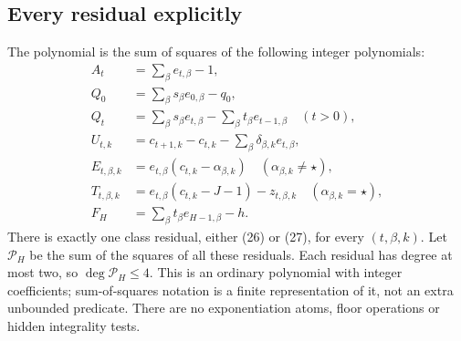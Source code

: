 \documentclass[11pt,a4paper]{article}
\numberwithin{equation}{section}
\begin{document}
\subsection{Every residual explicitly}
The polynomial is the sum of squares of the following integer polynomials:
\begin{align}
 A_t&=\sum_\beta e_{t,\beta}-1,                                      \tag{22}\\
 Q_0&=\sum_\beta s_\beta e_{0,\beta}-q_0,                            \tag{23}\\
 Q_t&=\sum_\beta s_\beta e_{t,\beta}
          -\sum_\beta t_\beta e_{t-1,\beta}\quad(t>0),              \tag{24}\\
 U_{t,k}&=c_{t+1,k}-c_{t,k}-\sum_\beta\delta_{\beta,k}e_{t,\beta},   \tag{25}\\
 E_{t,\beta,k}&=e_{t,\beta}(c_{t,k}-\alpha_{\beta,k})
           \quad(\alpha_{\beta,k}\ne\star),                       \tag{26}\\
 T_{t,\beta,k}&=e_{t,\beta}(c_{t,k}-J-1)-z_{t,\beta,k}
           \quad(\alpha_{\beta,k}=\star),                         \tag{27}\\
 F_H&=\sum_\beta t_\beta e_{H-1,\beta}-h.                           \tag{28}
\end{align}
There is exactly one class residual, either (26) or (27), for every
$(t,\beta,k)$. Let $\mathcal P_H$ be the sum of the squares of all these
residuals. Each residual has degree at most two, so $\deg\mathcal P_H\le4$.
This is an ordinary polynomial with integer coefficients; sum-of-squares
notation is a finite representation of it, not an extra unbounded predicate.
There are no exponentiation atoms, floor operations or hidden integrality
tests.
\end{document}
